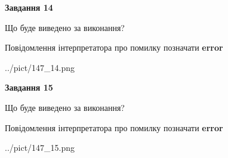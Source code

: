 \documentclass[11pt, ukrainian]{article}
\begin{document}
{\begin {large}
{\begin {center}\textbf{Завдання 14}\end {center}}\par
Що буде виведено за виконання? \par
Повідомлення інтерпретатора про помилку позначати \textbf{error}

\begin{center}
	{../pict/147_14.png}
\end{center}
\newpage

{\begin {center}\textbf{Завдання 15}\end {center}}\par
Що буде виведено за виконання? \par
Повідомлення інтерпретатора про помилку позначати \textbf{error}

\begin{center}
	{../pict/147_15.png}
\end{center}
\newpage

\end {large}}
\end{document}
